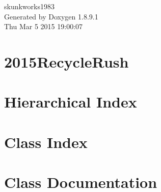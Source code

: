 \documentclass[twoside]{book}
\newcommand{\+}{\discretionary{\mbox{\scriptsize$\hookleftarrow$}}{}{}}
\newcommand{\clearemptydoublepage}{%
  \newpage{\pagestyle{empty}\cleardoublepage}%
}
\begin{document}
\hypersetup{pageanchor=false,
             bookmarks=true,
             bookmarksnumbered=true,
             pdfencoding=unicode
            }
\begin{titlepage}
\vspace*{7cm}
\begin{center}%
{\Large skunkworks1983 }\\
\vspace*{1cm}
{\large Generated by Doxygen 1.8.9.1}\\
\vspace*{0.5cm}
{\small Thu Mar 5 2015 19:00:07}\\
\end{center}
\end{titlepage}
\clearemptydoublepage
\tableofcontents
\clearemptydoublepage
{}
\hypersetup{pageanchor=true}

\chapter{2015\+Recycle\+Rush}
\label{md__r_e_a_d_m_e}
\hypertarget{md__r_e_a_d_m_e}{}

\chapter{Hierarchical Index}

\chapter{Class Index}

\chapter{Class Documentation}
















































\backmatter
\newpage
{}
\clearemptydoublepage
{}
\printindex
\end{document}
